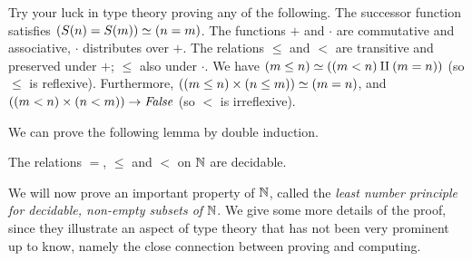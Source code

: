 \begin{xca}\label{xca:try-your-luck-N}
Try your luck in type theory proving any of the following.
The successor function satisfies $(S(n)=S(m))\simeq(n=m)$.
The functions $+$ and $\cdot$ are commutative and associative,
$\cdot$ distributes over $+$.
The relations $\leq$ and $<$ are transitive and
preserved under $+$; $\leq$ also under $\cdot$. 
We have $(m\leq n) \simeq ((m<n)\amalg(m=n))$ (so $\leq$ is reflexive).
Furthermore, $((m\leq n)\times (n\leq m)) \simeq (m=n)$,
and $((m<n)\times(n<m))\to\mathop{\mathit{False}}$ (so $<$ is irreflexive).
\end{xca}

We can prove the following lemma by double induction.

\begin{lemma}\label{lem:dec-eq+order-N}
The relations $=$, $\leq$ and $<$ on $\mathbb{N}$ are decidable.
\end{lemma}

We will now prove an important property of $\mathbb{N}$, called the
\emph{least number principle for decidable, non-empty subsets of} $\mathbb{N}$.
We give some more details of the proof, since they illustrate an aspect
of type theory that has not been very prominent up to know, namely
the close connection between proving and computing.

